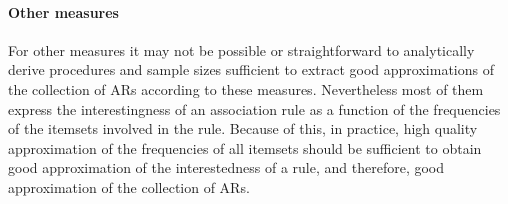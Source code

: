 \paragraph{Other measures}
For other measures it may not be possible or straightforward to analytically derive
procedures and sample sizes sufficient to extract good approximations of the
collection of ARs according to these measures. Nevertheless most of them
express the interestingness of an association rule as a function of the
frequencies of the itemsets involved in the rule. Because of this, in practice,
 high quality approximation of the frequencies of all itemsets should be
sufficient to obtain good approximation of the interestedness of a rule, and
therefore, good approximation of the collection of ARs.

